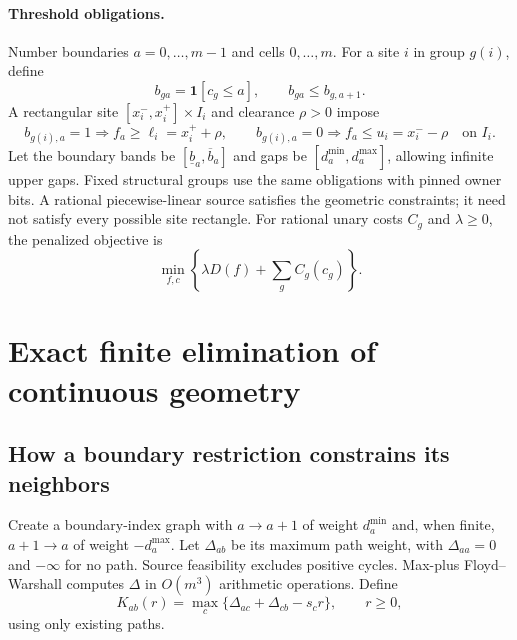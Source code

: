 \documentclass[10pt,letterpaper]{article}
\newcommand{\ind}{\mathbf 1}
\begin{document}
\paragraph{Threshold obligations.}
Number boundaries $a=0,\ldots,m-1$ and cells $0,\ldots,m$. For a site $i$ in group $g(i)$, define
\begin{equation}
b_{ga}=\ind[c_g\leq a],\qquad b_{ga}\leq b_{g,a+1}.\label{eq:bits}
\end{equation}
A rectangular site $[x_i^-,x_i^+]\times I_i$ and clearance $\rho>0$ impose
\begin{equation}
b_{g(i),a}=1\Rightarrow f_a\geq\ell_i=x_i^++\rho,\qquad
b_{g(i),a}=0\Rightarrow f_a\leq u_i=x_i^--\rho
\quad\text{on }I_i.\label{eq:obligations}
\end{equation}
Let the boundary bands be $[\underline b_a,\overline b_a]$ and gaps be $[d_a^{\min},d_a^{\max}]$, allowing infinite upper gaps. Fixed structural groups use the same obligations with pinned owner bits. A rational piecewise-linear source satisfies the geometric constraints; it need not satisfy every possible site rectangle. For rational unary costs $C_g$ and $\lambda\geq0$, the penalized objective is
\begin{equation}
\min_{f,c}\left\{\lambda D(f)+\sum_g C_g(c_g)\right\}.\label{eq:objective}
\end{equation}
\section{Exact finite elimination of continuous geometry}\label{sec:theory}
\subsection{How a boundary restriction constrains its neighbors}
Create a boundary-index graph with $a\to a+1$ of weight $d_a^{\min}$ and, when finite, $a+1\to a$ of weight $-d_a^{\max}$. Let $\Delta_{ab}$ be its maximum path weight, with $\Delta_{aa}=0$ and $-\infty$ for no path. Source feasibility excludes positive cycles. Max-plus Floyd--Warshall computes $\Delta$ in $O(m^3)$ arithmetic operations. Define
\begin{equation}
 K_{ab}(r)=\max_c\{\Delta_{ac}+\Delta_{cb}-s_c r\},\qquad r\ge0,\label{eq:kernel}
\end{equation}
using only existing paths.
\end{document}
